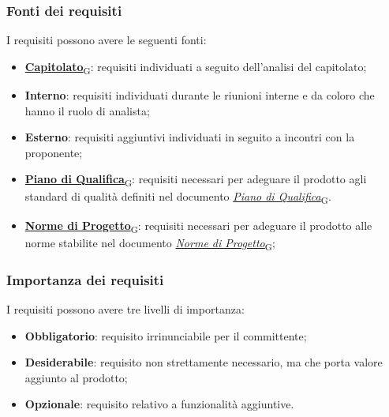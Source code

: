 \subsubsection{Fonti dei requisiti}
\label{sec:fonti_requisiti}
I requisiti possono avere le seguenti fonti:
\begin{itemize}
	\item \href{https://7last.github.io/docs/rtb/documentazione-interna/glossario\#capitolato}{\textbf{Capitolato}\textsubscript{G}}: requisiti individuati a seguito dell'analisi del capitolato;
	\item \textbf{Interno}: requisiti individuati durante le riunioni interne e da coloro che hanno il ruolo di analista;
	\item \textbf{Esterno}: requisiti aggiuntivi individuati in seguito a incontri con la proponente;
	\item \href{https://7last.github.io/docs/rtb/documentazione-interna/glossario\#piano-di-qualifica}{\textbf{Piano di Qualifica}\textsubscript{G}}: requisiti necessari per adeguare il prodotto agli standard di qualità definiti nel documento \href{https://7last.github.io/docs/rtb/documentazione-interna/glossario\#piano-di-qualifica}{\textit{Piano di Qualifica}\textsubscript{G}}.
	\item \href{https://7last.github.io/docs/rtb/documentazione-interna/glossario\#norme-di-progetto}{\textbf{Norme di Progetto}\textsubscript{G}}: requisiti necessari per adeguare il prodotto alle norme stabilite nel documento \href{https://7last.github.io/docs/rtb/documentazione-interna/glossario\#norme-di-progetto}{\textit{Norme di Progetto}\textsubscript{G}};
\end{itemize}

\subsubsection{Importanza dei requisiti}
\label{sec:importanza_requisiti}
I requisiti possono avere tre livelli di importanza:
\begin{itemize}
	\item \textbf{Obbligatorio}: requisito irrinunciabile per il committente;
	\item \textbf{Desiderabile}: requisito non strettamente necessario, ma che porta valore aggiunto al prodotto;
	\item \textbf{Opzionale}: requisito relativo a funzionalità aggiuntive.
\end{itemize}

\pagebreak

